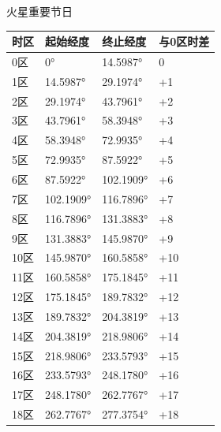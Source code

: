 \documentclass[letterpaper,10pt]{sphinxmanual}
\begin{document}
\begin{threeparttable}
\capstart\caption{火星重要节日}

\begin{tabulary}{\linewidth}{|L|L|L|L|}
\hline
\textsf{\relax 
时区
} & \textsf{\relax 
起始经度
} & \textsf{\relax 
终止经度
} & \textsf{\relax 
与0区时差
}\\
\hline
0区
 & 
0°
 & 
14.5987°
 & 
0
\\

1区
 & 
14.5987°
 & 
29.1974°
 & 
+1
\\

2区
 & 
29.1974°
 & 
43.7961°
 & 
+2
\\

3区
 & 
43.7961°
 & 
58.3948°
 & 
+3
\\

4区
 & 
58.3948°
 & 
72.9935°
 & 
+4
\\

5区
 & 
72.9935°
 & 
87.5922°
 & 
+5
\\

6区
 & 
87.5922°
 & 
102.1909°
 & 
+6
\\

7区
 & 
102.1909°
 & 
116.7896°
 & 
+7
\\

8区
 & 
116.7896°
 & 
131.3883°
 & 
+8
\\

9区
 & 
131.3883°
 & 
145.9870°
 & 
+9
\\

10区
 & 
145.9870°
 & 
160.5858°
 & 
+10
\\

11区
 & 
160.5858°
 & 
175.1845°
 & 
+11
\\

12区
 & 
175.1845°
 & 
189.7832°
 & 
+12
\\

13区
 & 
189.7832°
 & 
204.3819°
 & 
+13
\\

14区
 & 
204.3819°
 & 
218.9806°
 & 
+14
\\

15区
 & 
218.9806°
 & 
233.5793°
 & 
+15
\\

16区
 & 
233.5793°
 & 
248.1780°
 & 
+16
\\

17区
 & 
248.1780°
 & 
262.7767°
 & 
+17
\\

18区
 & 
262.7767°
 & 
277.3754°
 & 
+18
\\


\end{tabulary}
\end{threeparttable}
\end{document}
